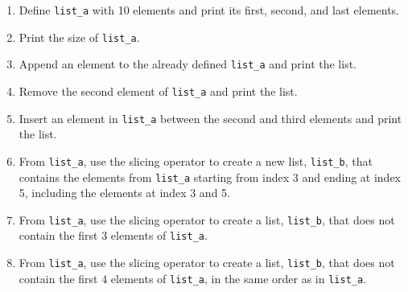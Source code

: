 \documentclass[11pt]{article}
\begin{document}
\begin{enumerate}
\def\labelenumi{\arabic{enumi}.}
\item
  Define \texttt{list\_a} with 10 elements and print its first, second,
  and last elements.
\item
  Print the size of \texttt{list\_a}.
\item
  Append an element to the already defined \texttt{list\_a} and print
  the list.
\item
  Remove the second element of \texttt{list\_a} and print the list.
\item
  Insert an element in \texttt{list\_a} between the second and third
  elements and print the list.
\item
  From \texttt{list\_a}, use the slicing operator to create a new list,
  \texttt{list\_b}, that contains the elements from \texttt{list\_a}
  starting from index 3 and ending at index 5, including the elements at
  index 3 and 5.
\item
  From \texttt{list\_a}, use the slicing operator to create a list,
  \texttt{list\_b}, that does not contain the first 3 elements of
  \texttt{list\_a}.
\item
  From \texttt{list\_a}, use the slicing operator to create a list,
  \texttt{list\_b}, that does not contain the first 4 elements of
  \texttt{list\_a}, in the same order as in \texttt{list\_a}. \newpage
\end{enumerate}
\end{document}
